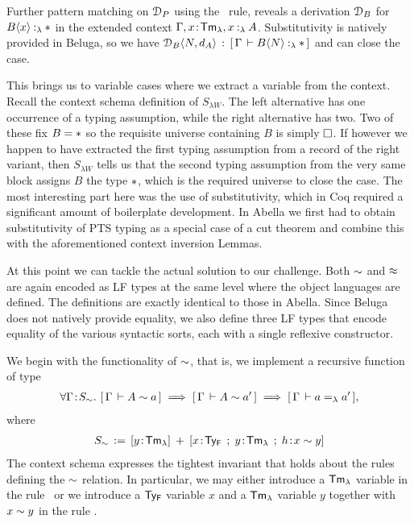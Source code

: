 
Further pattern matching on $\mathcal{D}_P$ using the \tpi~rule, 
reveals a derivation $\mathcal{D}_B$ for $\typingLh{\lpApp{B}{x}}{\Prp}$ in the extended context $\Gamma, x\!:\!\mathsf{Tm_{\lambda}}, x \mathbin{:_{\lambda}} A$. 
%
Substitutivity is natively provided in Beluga, so we have $\lpApp{\D_B}{N,d_A} \OF \bc{\Gamma}{\typingLh{\lpApp{B}{N}}{\Prp}}$ and can close the case.

This brings us to variable cases where we extract a variable from the context. 
Recall the context schema definition of $S_{\lambda W}$.
The left alternative has one occurrence of a typing assumption, while the right alternative has two.
Two of these fix $B = \Prp$ so the requisite universe containing $B$ is simply $\square$.
If however we happen to have extracted the first typing assumption from a record of the right variant, then $S_{\lambda W}$ tells us that the second typing assumption from the very same block assigns $B$ the type $\Prp$, which is the required universe to close the case.
%
The most interesting part here was the use of substitutivity, which in Coq required a significant amount of boilerplate development.
In Abella we first had to obtain substitutivity of PTS typing as a special case of a cut theorem and combine this with the aforementioned context inversion Lemmas.

At this point we can tackle the actual solution to our challenge.
Both $\mathrel{\sim}$ and $\mathrel{\approx}$ are again encoded as LF types at the same level where the object languages are defined. The definitions are exactly identical to those in Abella.
Since Beluga does not natively provide equality, we also define three LF types that encode equality of the various syntactic sorts, each with a single reflexive constructor.

We begin with the functionality of $\mathrel{\sim}$, that is, we implement a recursive function of type
\begin{align*}
  \forall \Gamma \!:\! S_{\mathrel{\sim}}.\,\, [\,\Gamma\,\vdash A \mathrel{\sim} a\,] \implies [\,\Gamma\,\vdash A \mathrel{\sim} a'\,] \implies [\,\Gamma\,\vdash a =_{\lambda} a'\,],
\end{align*}
where 
\begin{align*}
  S_{\tyr} \eqdef [y \of \TmL] \mrel{+} [x\of\TyF \mrel{;} y\of\TmL \mrel{;} h\of x \tyr y]
\end{align*}
The context schema expresses the tightest invariant that holds about the rules defining the $\mathrel{\sim}$ relation.%
In particular, we may either introduce a $\mathsf{Tm_{\lambda}}$ variable in the rule \rarr~or we introduce a $\mathsf{Ty_{F}}$ variable $x$ and a $\mathsf{Tm_{\lambda}}$ variable $y$ together with $x \mathrel{\sim} y$ in the rule \rall.


